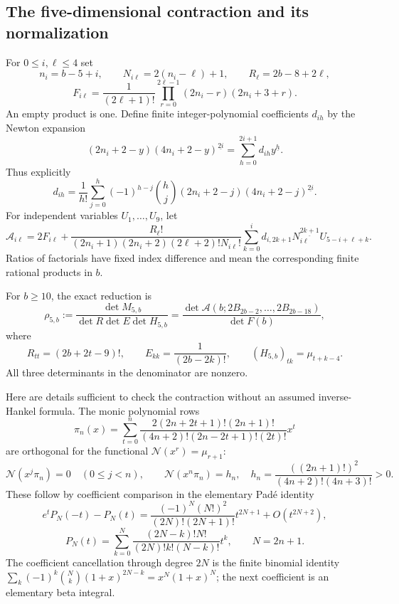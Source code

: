 \subsection{The five-dimensional contraction and its normalization}

For $0\le i,\ell\le4$ set
\[
 n_i=b-5+i,\qquad N_{i\ell}=2(n_i-\ell)+1,
 \qquad R_\ell=2b-8+2\ell,
\]
\[
 F_{i\ell}=\frac1{(2\ell+1)!}
       \prod_{r=0}^{2\ell-1}(2n_i-r)(2n_i+3+r).
\]
An empty product is one. Define finite integer-polynomial coefficients
$d_{ih}$ by the Newton expansion
\begin{equation}\label{mt10:newton}
 (2n_i+2-y)(4n_i+2-y)^{\underline{2i}}
   =\sum_{h=0}^{2i+1}d_{ih}y^{\underline h}.
\end{equation}
Thus explicitly
\[
 d_{ih}=\frac1{h!}\sum_{j=0}^h(-1)^{h-j}\binom hj
           (2n_i+2-j)(4n_i+2-j)^{\underline{2i}}.
\]
For independent variables $U_1,\ldots,U_9$, let
\begin{equation}\label{mt10:A}
 \mathcal A_{i\ell}=2F_{i\ell}+
 \frac{R_\ell!}{(2n_i+1)(2n_i+2)(2\ell+2)!N_{i\ell}!}
 \sum_{k=0}^i d_{i,2k+1}N_{i\ell}^{\underline{2k+1}}
                      U_{5-i+\ell+k}.
\end{equation}
Ratios of factorials have fixed index difference and mean the
corresponding finite rational products in $b$.

For $b\ge10$, the exact reduction is
\begin{equation}\label{mt10:ratio}
 \rho_{5,b}:=\frac{\det M_{5,b}}{\det R\det E\det H_{5,b}}
  =\frac{\det\mathcal A(b;2B_{2b-2},\ldots,2B_{2b-18})}
         {\det F(b)},
\end{equation}
where
\[
 R_{tt}=(2b+2t-9)!,\qquad E_{kk}=\frac1{(2b-2k)!},
 \qquad (H_{5,b})_{tk}=\mu_{t+k-4}.
\]
All three determinants in the denominator are nonzero.

Here are details sufficient to check the contraction without an
assumed inverse-Hankel formula. The monic polynomial rows
\[
 \pi_n(x)=\sum_{t=0}^n
 \frac{2(2n+2t+1)!(2n+1)!}
 {(4n+2)!(2n-2t+1)!(2t)!}x^t
\]
are orthogonal for the functional $\mathcal N(x^r)=\mu_{r+1}$:
\[
 \mathcal N(x^j\pi_n)=0\quad(0\le j<n),\qquad
 \mathcal N(x^n\pi_n)=h_n,
 \quad h_n=\frac{((2n+1)!)^2}{(4n+2)!(4n+3)!}>0.
\]
These follow by coefficient comparison in the elementary Pad\'e identity
\[
 e^tP_N(-t)-P_N(t)
 =\frac{(-1)^N(N!)^2}{(2N)!(2N+1)!}t^{2N+1}
        +O(t^{2N+2}),
\]
\[
 P_N(t)=\sum_{k=0}^N
       \frac{(2N-k)!N!}{(2N)!k!(N-k)!}t^k,
 \qquad N=2n+1.
\]
The coefficient cancellation through degree $2N$ is the finite binomial
identity $\sum_k(-1)^k\binom Nk(1+x)^{2N-k}=x^N(1+x)^N$;
the next coefficient is an elementary beta integral.

